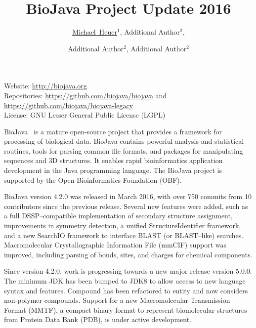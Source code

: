 \documentclass[10pt,oneside]{article}
\title{BioJava Project Update 2016}
\author{\small \underline{Michael~Heuer}$^{1}$, Additional Author$^{2}$,
\and \small Additional Author$^{2}$, Additional Author${^2}$}
\date{}
\begin{document}

\renewcommand{\thefootnote}{\fnsymbol{footnote}}


\maketitle

\vspace{-0.25in}
\noindent
{\small
Website: \url{http://biojava.org} \\
Repositories: \url{https://github.com/biojava/biojava} and \url{https://github.com/biojava/biojava-legacy}\\
License: GNU Lesser General Public License (LGPL)\\
}

BioJava~\cite{prlic2012biojava} is a mature open-source project that provides a framework for processing of
biological data. BioJava contains powerful analysis and statistical routines, tools for parsing common file
formats, and packages for manipulating sequences and 3D structures. It enables rapid bioinformatics application
development in the Java programming language. The BioJava project is supported by the Open Bioinformatics
Foundation (OBF).


BioJava version 4.2.0 was released in March 2016, with over 750 commits from 10 contributors since the
previous release.  Several new features were added, such as a full DSSP--compatible implementation of secondary
structure assignment, improvements in symmetry detection, a unified StructureIdentifier framework, and a
new SearchIO framework to interface {BLAST} (or {BLAST}--like) searches.  Macromolecular Crystallographic
Information File ({mmCIF}) support was improved, including parsing of bonds, sites, and charges for
chemical components.


Since version 4.2.0, work is progressing towards a new major release version 5.0.0.  The minimum JDK has been
bumped to JDK8 to allow access to new language syntax and features.  Compound has been refactored to entity
and now considers non-polymer compounds.  Support for a new Macromolecular Transmission Format ({MMTF}), a compact
binary format to represent biomolecular structures from Protein Data Bank ({PDB}), is under active development.



\end{document}

